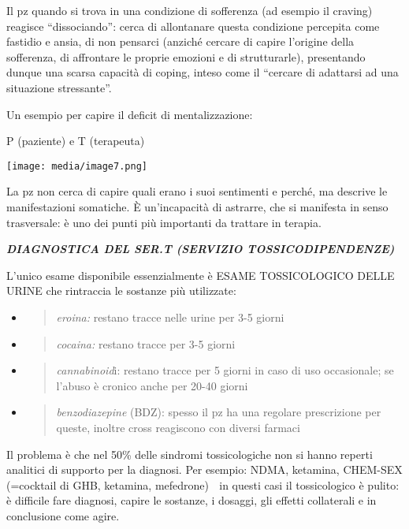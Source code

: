\documentclass[]{article}
\begin{document}
Il pz quando si trova in una condizione di sofferenza (ad esempio il
craving) reagisce ``dissociando'': cerca di allontanare questa
condizione percepita come fastidio e ansia, di non pensarci (anziché
cercare di capire l'origine della sofferenza, di affrontare le proprie
emozioni e di strutturarle), presentando dunque una scarsa capacità di
coping, inteso come il ``cercare di adattarsi ad una situazione
stressante''.

Un esempio per capire il deficit di mentalizzazione:

P (paziente) e T (terapeuta)

\texttt{[image: media/image7.png]}

La pz non cerca di capire quali erano i suoi sentimenti e perché, ma
descrive le manifestazioni somatiche. È un'incapacità di astrarre, che
si manifesta in senso trasversale: è uno dei punti più importanti da
trattare in terapia.

\textbf{\emph{DIAGNOSTICA DEL SER.T (SERVIZIO TOSSICODIPENDENZE)}}

L'unico esame disponibile essenzialmente è ESAME TOSSICOLOGICO DELLE
URINE che rintraccia le sostanze più utilizzate:

\begin{itemize}
\item
  \begin{quote}
  \emph{eroina:} restano tracce nelle urine per 3-5 giorni
  \end{quote}
\item
  \begin{quote}
  \emph{cocaina:} restano tracce per 3-5 giorni
  \end{quote}
\item
  \begin{quote}
  \emph{cannabinoid}i: restano tracce per 5 giorni in caso di uso
  occasionale; se l'abuso è cronico anche per 20-40 giorni
  \end{quote}
\item
  \begin{quote}
  \emph{benzodiazepine} (BDZ): spesso il pz ha una regolare prescrizione
  per queste, inoltre cross reagiscono con diversi farmaci
  \end{quote}
\end{itemize}

Il problema è che nel 50\% delle sindromi tossicologiche non si hanno
reperti analitici di supporto per la diagnosi. Per esempio: NDMA,
ketamina, CHEM-SEX (=cocktail di GHB, ketamina, mefedrone)  in questi
casi il tossicologico è pulito: è difficile fare diagnosi, capire le
sostanze, i dosaggi, gli effetti collaterali e in conclusione come
agire.
\end{document}
